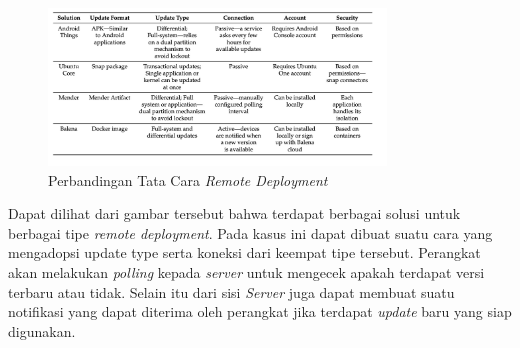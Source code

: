 \begin{figure}[ht]
  \centering
  \includegraphics[width=0.8\textwidth]{resources/chapter-2/perbandingan-remote-deployment.jpg}
  \caption{Perbandingan Tata Cara \textit{Remote Deployment} \parencite{RemoteDeployment}}
  \label{fig:comparison-remote-deployments}
\end{figure}

Dapat dilihat dari gambar tersebut bahwa terdapat berbagai solusi untuk berbagai tipe \textit{remote deployment}. Pada kasus ini dapat dibuat suatu cara yang mengadopsi update type serta koneksi dari keempat tipe tersebut. Perangkat akan melakukan \textit{polling} kepada \textit{server} untuk mengecek apakah terdapat versi terbaru atau tidak. Selain itu dari sisi \textit{Server} juga dapat membuat suatu notifikasi yang dapat diterima oleh perangkat jika terdapat \textit{update} baru yang siap digunakan.